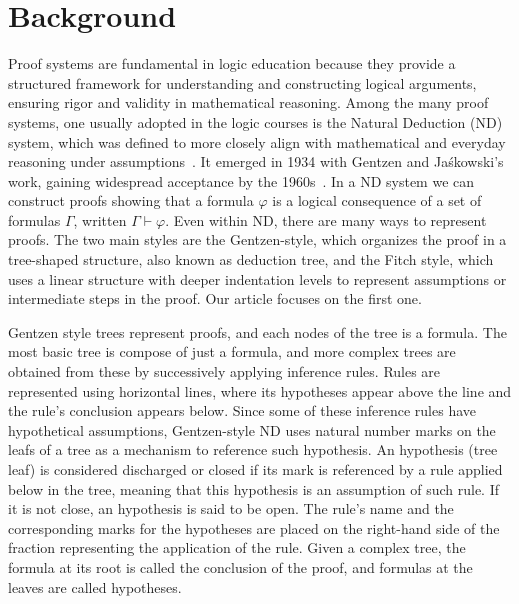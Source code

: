\section{Background}
Proof systems are fundamental in logic education because they provide a structured framework for understanding and constructing logical arguments, ensuring rigor and validity in mathematical reasoning. Among the many proof systems, one usually adopted in the logic courses is the Natural Deduction (ND) system, which was defined to more closely align with mathematical and everyday reasoning under assumptions~\cite{nd-mancosu}. It emerged in 1934 with Gentzen and Jaśkowski's work, gaining widespread acceptance by the 1960s~\cite{Pelletier1999-FRAABH}. In a ND system we can construct proofs showing that a formula \(\varphi\) is a logical consequence of a set of formulas \(\Gamma\), written \(\Gamma \vdash \varphi\). 
Even within ND, there are many ways to represent proofs. The two main styles are the Gentzen-style, which organizes the proof in a tree-shaped structure, also known as deduction tree, and the Fitch style, which uses a linear structure with deeper indentation levels to represent assumptions or intermediate steps in the proof. Our article focuses on the first one. 

Gentzen style trees represent proofs, and each nodes of the tree is a formula. The most basic tree is compose of just a formula, and more complex trees are obtained from these by successively applying inference rules. Rules are represented using horizontal lines, where its hypotheses appear above the line and the rule’s conclusion appears below. Since some of these inference rules have hypothetical assumptions, Gentzen-style ND uses natural number marks on the leafs of a tree as a mechanism to reference such hypothesis. An hypothesis (tree leaf) is considered discharged or closed if its mark is referenced by a rule applied below in the tree, meaning that this hypothesis is an assumption of such rule. If it is not close, an hypothesis is said to be open. The rule’s name and the corresponding marks for the hypotheses are placed on the right-hand side of the fraction representing the application of the rule.
Given a complex tree, the formula at its root is called the conclusion of the proof, and formulas at the leaves are called hypotheses.   

